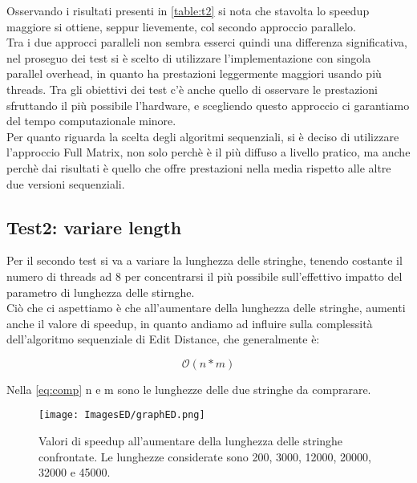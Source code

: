 \documentclass[10pt,twocolumn,letterpaper]{article}
\begin{document}
Osservando i risultati presenti in \cref{table:t2} si nota che stavolta lo speedup maggiore si ottiene, seppur lievemente, col secondo approccio parallelo.\\
Tra i due approcci paralleli non sembra esserci quindi una differenza significativa, nel proseguo dei test si è scelto di utilizzare l'implementazione con singola parallel overhead, in quanto ha prestazioni leggermente maggiori usando più threads. Tra gli obiettivi dei test c'è anche quello di osservare le prestazioni sfruttando il più possibile l'hardware, e scegliendo questo approccio ci garantiamo del tempo computazionale minore.\\
Per quanto riguarda la scelta degli algoritmi sequenziali, si è deciso di utilizzare l'approccio Full Matrix, non solo perchè è il più diffuso a livello pratico, ma anche perchè dai risultati è quello che offre prestazioni nella media rispetto alle altre due versioni sequenziali.

\subsection{Test2: variare length}
\label{sec:t2}
Per il secondo test si va a variare la lunghezza delle stringhe, tenendo costante il numero di threads ad 8 per concentrarsi il più possibile sull'effettivo impatto del parametro di lunghezza delle stirnghe.\\
Ciò che ci aspettiamo è che all'aumentare della lunghezza delle stringhe, aumenti anche il valore di speedup, in quanto andiamo ad influire sulla complessità dell'algoritmo sequenziale di Edit Distance, che generalmente è:

\begin{equation}
    \label{eq:comp}
    \mathcal{O}(n * m)
\end{equation}

Nella \cref{eq:comp} n e m sono le lunghezze delle due stringhe da comprarare.

\begin{figure}[h]
    \centering
    \texttt{[image: ImagesED/graphED.png]}
    \caption{Valori di speedup all'aumentare della lunghezza delle stringhe confrontate. Le lunghezze considerate sono 200, 3000, 12000, 20000, 32000 e 45000.}
    \label{fig:t2}
\end{figure}
\end{document}
